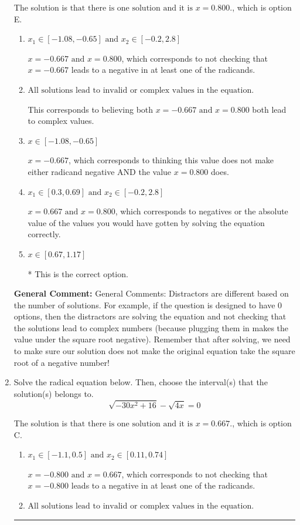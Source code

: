 \documentclass{extbook}[14pt]
\newcommand{\litem}[1]{\item #1

\rule{\textwidth}{0.4pt}}
\begin{document}
\begin{enumerate}
{The solution is \( \text{that there is one solution and it is } x = 0.800. \), which is option E.\begin{enumerate}[label=\Alph*.]
\item \( x_1 \in [-1.08, -0.65] \text{ and } x_2 \in [-0.2,2.8] \)

$x = -0.667 \text{ and } x = 0.800$, which corresponds to not checking that $x = -0.667$ leads to a negative in at least one of the radicands.
\item \( \text{All solutions lead to invalid or complex values in the equation.} \)

This corresponds to believing both $x = -0.667 \text{ and } x = 0.800$ both lead to complex values.
\item \( x \in [-1.08,-0.65] \)

$x = -0.667$, which corresponds to thinking this value does not make either radicand negative AND the value $x = 0.800$ does.
\item \( x_1 \in [0.3, 0.69] \text{ and } x_2 \in [-0.2,2.8] \)

$x = 0.667 \text{ and } x = 0.800$, which corresponds to negatives or the absolute value of the values you would have gotten by solving the equation correctly.
\item \( x \in [0.67,1.17] \)

* This is the correct option.
\end{enumerate}

\textbf{General Comment:} General Comments: Distractors are different based on the number of solutions. For example, if the question is designed to have 0 options, then the distractors are solving the equation and not checking that the solutions lead to complex numbers (because plugging them in makes the value under the square root negative). Remember that after solving, we need to make sure our solution does not make the original equation take the square root of a negative number!
}
\litem{
Solve the radical equation below. Then, choose the interval(s) that the solution(s) belongs to.
\[ \sqrt{-30 x^2 + 16} - \sqrt{4 x} = 0 \]

The solution is \( \text{that there is one solution and it is } x = 0.667. \), which is option C.\begin{enumerate}[label=\Alph*.]
\item \( x_1 \in [-1.1, 0.5] \text{ and } x_2 \in [0.11,0.74] \)

$x = -0.800 \text{ and } x = 0.667$, which corresponds to not checking that $x = -0.800$ leads to a negative in at least one of the radicands.
\item \( \text{All solutions lead to invalid or complex values in the equation.} \)


\end{enumerate}}
\end{enumerate}
\end{document}
